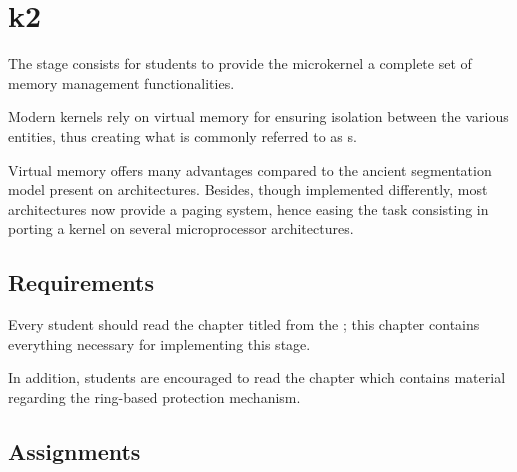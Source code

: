 %
%
%
%
%
%

%
%

\chapter{k2}
\label{chapter:k2}

The  stage consists for students to provide the microkernel a
complete set of memory management functionalities.

Modern kernels rely on virtual memory for ensuring isolation between the
various entities, thus creating what is commonly referred to as
s.

Virtual memory offers many advantages compared to the ancient segmentation
model present on  architectures. Besides, though implemented
differently, most architectures now provide a paging system, hence easing
the task consisting in porting a kernel on several microprocessor
architectures.

\newpage

%
%

%
%

\section{Requirements}

Every student should read the chapter titled  from the
; this chapter contains everything necessary for
implementing this stage.

In addition, students are encouraged to read the chapter 
which contains material regarding the  ring-based protection
mechanism.

%
%

\section{Assignments}

